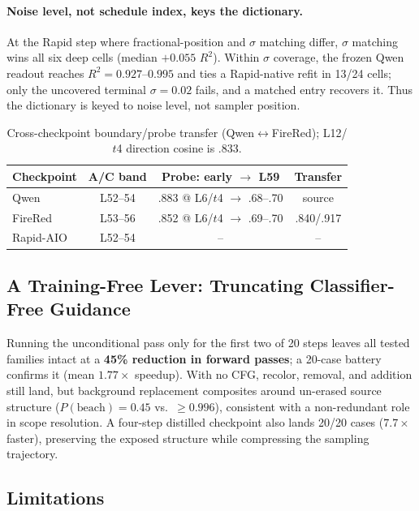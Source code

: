 \paragraph{Noise level, not schedule index, keys the dictionary.} At the Rapid
step where fractional-position and $\sigma$ matching differ, $\sigma$ matching
wins all six deep cells (median $+0.055$ $R^2$). Within $\sigma$ coverage, the
frozen Qwen readout reaches $R^2{=}0.927$--$0.995$ and ties a Rapid-native refit
in 13/24 cells; only the uncovered terminal $\sigma{=}0.02$ fails, and a matched
entry recovers it. Thus the dictionary is keyed to noise level, not sampler
position.

\begin{table}[t]
\caption{Cross-checkpoint boundary/probe transfer
(Qwen$\leftrightarrow$FireRed); L12/$t$4 direction cosine is .833.}
\label{tab:generalize}
\centering
\scriptsize
\setlength{\tabcolsep}{3pt}
\begin{tabular}{@{}lccc@{}}
\toprule
Checkpoint & A/C band & Probe: early $\to$ L59 & Transfer \\
\midrule
Qwen & L52--54 & .883 @ L6/$t$4 $\to$ .68--.70 & source \\
FireRed & L53--56 & .852 @ L6/$t$4 $\to$ .69--.70 & .840/.917 \\
Rapid-AIO & L52--54 & -- & -- \\
\bottomrule
\end{tabular}
\end{table}

\subsection{A Training-Free Lever: Truncating Classifier-Free Guidance}\label{sec:lever}

Running the unconditional pass only for the first two of 20 steps leaves all
tested families intact at a \textbf{45\% reduction in forward passes}; a
20-case battery confirms it (mean $1.77\times$ speedup). With no CFG, recolor,
removal, and addition still land, but background replacement composites around
un-erased source structure ($P(\text{beach}){=}0.45$ vs.\ ${\ge}0.996$),
consistent with a non-redundant role in scope resolution. A four-step distilled
checkpoint also lands 20/20 cases ($7.7\times$ faster), preserving the exposed
structure while compressing the sampling trajectory.

\subsection{Limitations}\label{sec:limits}

